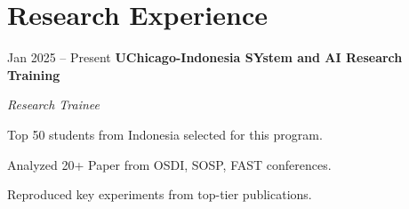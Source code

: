 \section{Research Experience}

\begin{twocolentry}{
    Jan 2025 – Present
}
\textbf{UChicago-Indonesia SYstem and AI Research Training}\end{twocolentry}
\textit{Research Trainee}

\vspace{0.10 cm}
\begin{onecolentry}
    \begin{highlights}
        \item Top 50 students from Indonesia selected for this program.
        \item Analyzed 20+ Paper from OSDI, SOSP, FAST conferences.
        \item Reproduced key experiments from top-tier publications.
    \end{highlights}
\end{onecolentry}
